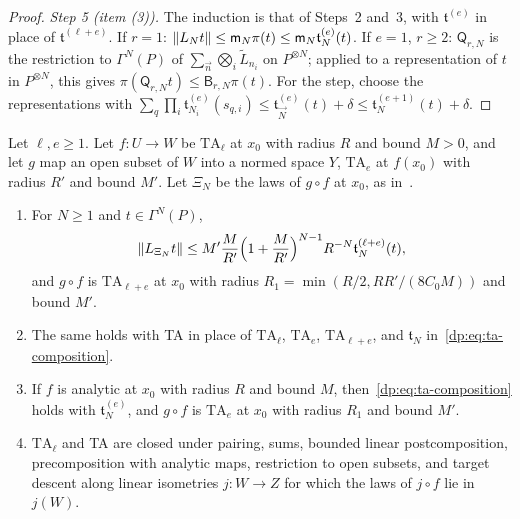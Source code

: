 \begin{proof}
\emph{Step 5 (item (3)).} The induction is that of Steps~2 and~3, with $\mathfrak t^{(e)}$ in place of $\mathfrak t^{(\ell+e)}$. If $r=1$: $\lVert L_Nt\rVert\le\mathsf m_N\pi(t)\le\mathsf m_N\mathfrak t^{(e)}_N(t)$. If $e=1$, $r\ge2$: $\mathsf Q_{r,N}$ is the restriction to $\Gamma^N(P)$ of $\sum_{\vec n}\bigotimes_i\tilde L_{n_i}$ on $P^{\otimes N}$; applied to a representation of $t$ in $P^{\otimes N}$, this gives $\pi(\mathsf Q_{r,N}t)\le\mathsf B_{r,N}\pi(t)$. For the step, choose the representations with $\sum_q\prod_i\mathfrak t^{(e)}_{N_i}(s_{q,i})\le\mathfrak t^{(e)}_{\vec N}(t)+\delta\le\mathfrak t^{(e+1)}_N(t)+\delta$.
\end{proof}

\begin{theorem}[composition]\label{dp:thm:ta-composition}
Let $\ell,e\ge1$. Let $f\colon U\to W$ be $\mathrm{TA}_\ell$ at $x_0$ with radius $R$ and bound $M>0$, and let $g$ map an open subset of $W$ into a normed space $Y$, $\mathrm{TA}_e$ at $f(x_0)$ with radius $R'$ and bound $M'$. Let $\Xi_N$ be the laws of $g\circ f$ at $x_0$, as in~\cite[Lemma~Q.3]{I}.
\begin{enumerate}
\item For $N\ge1$ and $t\in\Gamma^N(P)$,
\begin{equation}\label{dp:eq:ta-composition}
 \lVert L_{\Xi_N}t\rVert\le M'\frac M{R'}\Bigl(1+\frac M{R'}\Bigr)^{N-1}R^{-N}\mathfrak t^{(\ell+e)}_N(t),
\end{equation}
and $g\circ f$ is $\mathrm{TA}_{\ell+e}$ at $x_0$ with radius $R_1=\min(R/2,RR'/(8C_0M))$ and bound $M'$.
\item The same holds with TA in place of $\mathrm{TA}_\ell$, $\mathrm{TA}_e$, $\mathrm{TA}_{\ell+e}$, and $\mathfrak t_N$ in~\eqref{dp:eq:ta-composition}.
\item If $f$ is analytic at $x_0$ with radius $R$ and bound $M$, then~\eqref{dp:eq:ta-composition} holds with $\mathfrak t^{(e)}_N$, and $g\circ f$ is $\mathrm{TA}_e$ at $x_0$ with radius $R_1$ and bound $M'$.
\item $\mathrm{TA}_\ell$ and TA are closed under pairing, sums, bounded linear postcomposition, precomposition with analytic maps, restriction to open subsets, and target descent along linear isometries $j\colon W\to Z$ for which the laws of $j\circ f$ lie in $j(W)$.
\end{enumerate}
\end{theorem}

